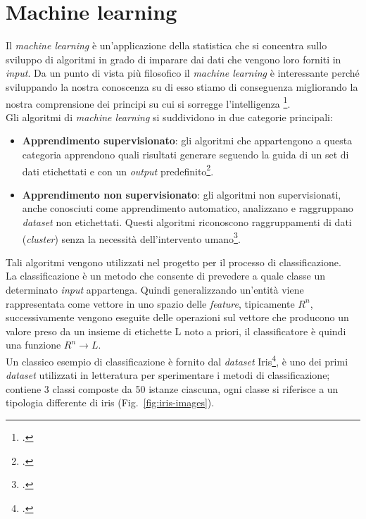 \chapter{Machine learning}
\label{cap:teoria}

\vspace{0.5cm} 

Il \emph{machine learning} è un'applicazione della statistica che si concentra sullo sviluppo di algoritmi in grado di imparare dai dati che vengono loro forniti in \emph{input}.
Da un punto di vista più filosofico il \emph{machine learning} è interessante perché sviluppando la nostra conoscenza su di esso stiamo di conseguenza migliorando la nostra comprensione dei principi su cui si sorregge l'intelligenza \footcite[p.~97]{Goodfellow-et-al-2016}.\\Gli algoritmi di \emph{machine learning} si suddividono in due categorie principali:

\begin{itemize}
    \item \textbf{Apprendimento supervisionato}: gli algoritmi che appartengono a questa categoria apprendono quali risultati generare seguendo la guida di un set di dati etichettati e con un \emph{output} predefinito\footcite{site:machine-learning}.

    \item \textbf{Apprendimento non supervisionato}: gli algoritmi non supervisionati, anche conosciuti come apprendimento automatico, analizzano e raggruppano \emph{\gls{dataset}} non etichettati. Questi algoritmi riconoscono raggruppamenti di dati (\emph{cluster}) senza la necessità dell'intervento umano\footcite{site:machine-learning}.
\end{itemize}
Tali algoritmi vengono utilizzati nel progetto per il processo di classificazione.\\
La classificazione è un metodo che consente di prevedere a quale classe un determinato \emph{input} appartenga. 
Quindi generalizzando un'entità viene rappresentata come vettore in uno spazio delle \emph{\gls{feature}}, tipicamente \( R^n \), successivamente vengono eseguite delle operazioni sul vettore che producono un valore preso da un insieme di etichette L noto a priori, il classificatore è quindi una funzione \( R^n \rightarrow L \).\\Un classico esempio di classificazione è fornito dal \emph{\gls{dataset}} Iris\footcite{site:iris-dataset}, è uno dei primi \emph{\gls{dataset}} utilizzati in letteratura per sperimentare i metodi di classificazione; contiene 3 classi composte da 50 istanze ciascuna, ogni classe si riferisce a un tipologia differente di iris (Fig.~\ref{fig:iris-images}).

